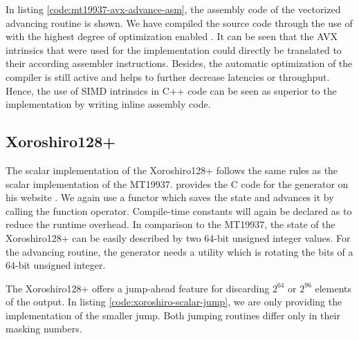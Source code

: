 \documentclass{stdlocal}
\begin{document}
    In listing \ref{code:mt19937-avx-advance-asm}, the assembly code of the vectorized advancing routine is shown.
    We have compiled the source code through the use of  with the highest degree of optimization enabled \autocite{compiler-explorer}.
    It can be seen that the AVX intrinsics that were used for the implementation could directly be translated to their according assembler instructions.
    Besides, the automatic optimization of the compiler is still active and helps to further decrease latencies or throughput.
    Hence, the use of SIMD intrinsics in C++ code can be seen as superior to the implementation by writing inline assembly code.

  \subsection{Xoroshiro128+} %
  \label{sub:xoroshiro}
    The scalar implementation of the Xoroshiro128+ follows the same rules as the scalar implementation of the MT19937.
    \citeauthor{vigna-xoroshiro} provides the C code for the generator on his website \autocite{vigna-xoroshiro}.
    We again use a functor which saves the state and advances it by calling the function operator.
    Compile-time constants will again be declared as  to reduce the runtime overhead.
    In comparison to the MT19937, the state of the Xoroshiro128+ can be easily described by two 64-bit unsigned integer values.
    For the advancing routine, the generator needs a utility which is rotating the bits of a 64-bit unsigned integer.

    The Xoroshiro128+ offers a jump-ahead feature for discarding $2^{64}$ or $2^{96}$ elements of the output.
    In listing \ref{code:xoroshiro-scalar-jump}, we are only providing the implementation of the smaller jump.
    Both jumping routines differ only in their masking numbers.

\end{document}
